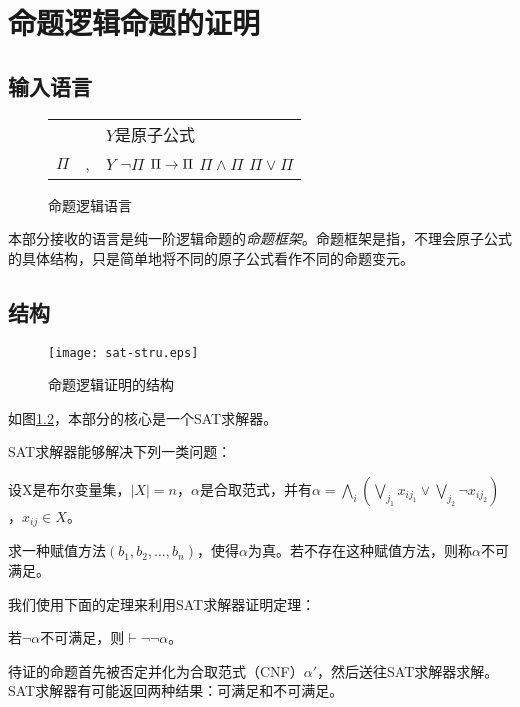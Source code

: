 \chapter{命题逻辑命题的证明}
\label{chap:sat}

\section{输入语言}
\begin{figure}[!htbp]
  \centering
  \begin{tabular}[rcl]{rcl}
    & & $Y$是原子公式 \\
    $\Pi$ & \sep{} & $Y$ \deli{} $\lnot \Pi$ \deli{} $\Pi \rightarrow \Pi$ \deli{} $\Pi \land \Pi$ \deli{} $\Pi \lor \Pi$ \\
  \end{tabular}
  \caption{命题逻辑语言}
  \label{sat:syntax}
\end{figure}
本部分接收的语言是纯一阶逻辑命题的\emph{命题框架}。命题框架是指，不理会原子公式的具体结构，只是简单地将不同的原子公式看作不同的命题变元。

\section{结构}
\begin{figure}[!htbp]
  \centering
  \texttt{[image: sat-stru.eps]}
  \caption{命题逻辑证明的结构}
  \label{sat:stru}
\end{figure}
如图\ref{sat:stru}，本部分的核心是一个SAT求解器。

SAT求解器能够解决下列一类问题：

\begin{definition}[SAT问题]
设X是布尔变量集，$|X|=n$，$\alpha$是合取范式，并有$\alpha = \bigwedge_i (\bigvee_{j_1} x_{ij_1} \lor \bigvee_{j_2} \lnot x_{ij_2})$，$x_{ij} \in X$。

求一种赋值方法$(b_1, b_2, \dots, b_n)$，使得$\alpha$为真。若不存在这种赋值方法，则称$\alpha$不可满足。
\end{definition}

我们使用下面的定理来利用SAT求解器证明定理：

\begin{theorem}
  若$\lnot \alpha$不可满足，则$\vdash \lnot \lnot \alpha$。
\end{theorem}

待证的命题首先被否定并化为合取范式（CNF）$\alpha'$，然后送往SAT求解器求解。SAT求解器有可能返回两种结果：可满足和不可满足。

